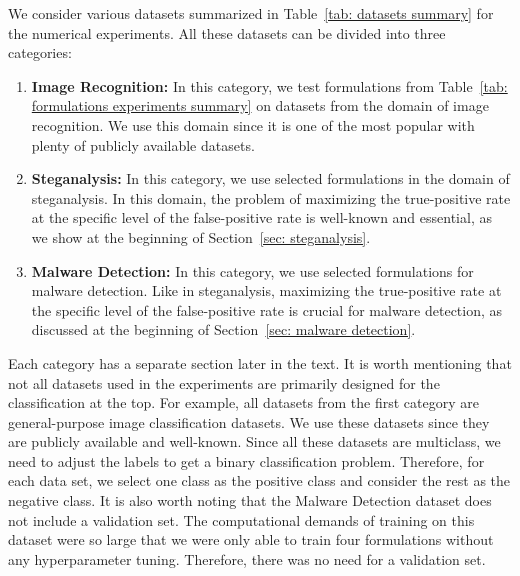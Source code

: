 We consider various datasets summarized in Table~\ref{tab: datasets summary} for the numerical experiments. All these datasets can be divided into three categories:
\begin{enumerate}
  \item \textbf{Image Recognition:} In this category, we test formulations from Table~\ref{tab: formulations experiments summary} on datasets from the domain of image recognition. We use this domain since it is one of the most popular with plenty of publicly available datasets.
  \item \textbf{Steganalysis:} In this category, we use selected formulations in the domain of steganalysis. In this domain, the problem of maximizing the true-positive rate at the specific level of the false-positive rate is well-known and essential, as we show at the beginning of Section~\ref{sec: steganalysis}.
  \item \textbf{Malware Detection:} In this category, we use selected formulations for malware detection. Like in steganalysis, maximizing the true-positive rate at the specific level of the false-positive rate is crucial for malware detection, as discussed at the beginning of Section~\ref{sec: malware detection}.
\end{enumerate}
Each category has a separate section later in the text. It is worth mentioning that not all datasets used in the experiments are primarily designed for the classification at the top. For example, all datasets from the first category are general-purpose image classification datasets. We use these datasets since they are publicly available and well-known. Since all these datasets are multiclass, we need to adjust the labels to get a binary classification problem. Therefore, for each data set, we select one class as the positive class and consider the rest as the negative class. It is also worth noting that the Malware Detection dataset does not include a validation set. The computational demands of training on this dataset were so large that we were only able to train four formulations without any hyperparameter tuning. Therefore, there was no need for a validation set.

